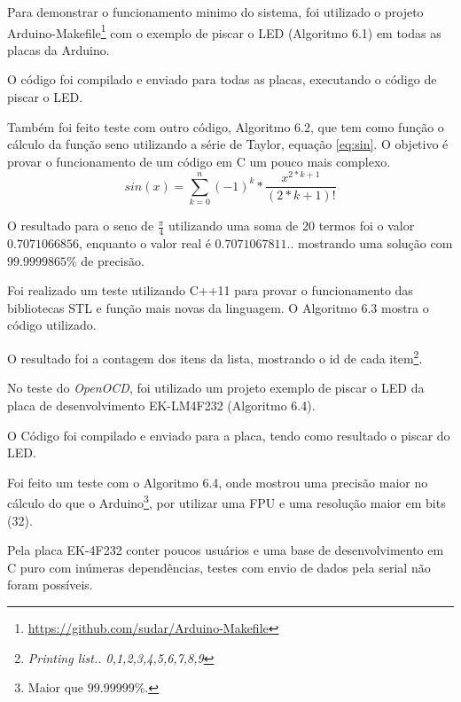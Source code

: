 Para demonstrar o funcionamento minimo do sistema, foi utilizado o projeto Arduino-Makefile\footnote{\url{https://github.com/sudar/Arduino-Makefile}} com o exemplo de piscar o LED (Algoritmo 6.1) em todas as placas da Arduino.



O código foi compilado e enviado para todas as placas, executando o código de piscar o LED.

Também foi feito teste com outro código, Algoritmo 6.2, que tem como função o cálculo da função seno utilizando a série de Taylor, equação \ref{eq:sin}. O objetivo é provar o funcionamento de um código em C um pouco mais complexo.
\begin{equation}
sin(x) = \sum_{k=0}^{n} (-1)^k * \frac{x^{2*k+1}}{(2*k+1)!}
\label{eq:sin} 
\end{equation}

O resultado para o seno de $\frac{\pi}{4}$ utilizando uma soma de 20 termos foi o valor $0.7071066856$, enquanto o valor real é $0.7071067811..$ mostrando uma solução com 
$99.9999865\%$ de precisão.

Foi realizado um teste utilizando C++11 para provar o funcionamento das bibliotecas STL e função mais novas da linguagem. O Algoritmo 6.3 mostra o código utilizado.



O resultado foi a contagem dos itens da lista, mostrando o id de cada item\footnote{\textit{Printing list.. 0,1,2,3,4,5,6,7,8,9}}.

No teste do \textit{OpenOCD}, foi utilizado um projeto exemplo de piscar o LED da placa de desenvolvimento EK-LM4F232 (Algoritmo 6.4).



O Código foi compilado e enviado para a placa, tendo como resultado o piscar do LED.

Foi feito um teste com o Algoritmo 6.4, onde mostrou uma precisão maior no cálculo do que o Arduino\footnote{Maior que $99.99999\%$.}, por utilizar uma FPU e uma resolução maior em bits (32).



Pela placa EK-4F232 conter poucos usuários e uma base de desenvolvimento em C puro com inúmeras dependências, testes com envio de dados pela serial não foram possíveis.


